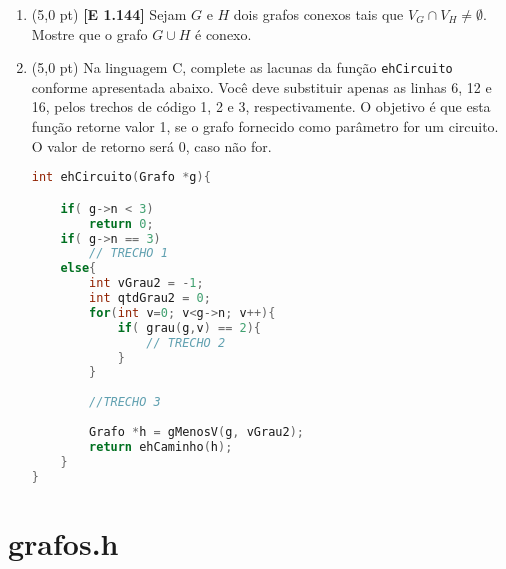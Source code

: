 \documentclass[12pt,a4paper,oneside]{article}
\begin{document}
\begin{enumerate}

	\item (5,0 pt) {\bf [E 1.144]} Sejam $G$ e $H$ dois grafos conexos tais que $V_G \cap V_H \not= \emptyset$. Mostre que o grafo $G \cup H$ é conexo.
	
	\item (5,0 pt) Na linguagem C, complete as lacunas da função {\tt ehCircuito} conforme apresentada abaixo. Você deve substituir apenas as linhas 6, 12 e 16, pelos trechos de código 1, 2 e 3, respectivamente. O objetivo é que esta função retorne valor 1, se o grafo fornecido como parâmetro for um circuito. O valor de retorno será 0, caso não for.

\begin{lstlisting}[language=C]
int ehCircuito(Grafo *g){

	if( g->n < 3)
		return 0;
	if( g->n == 3)
		// TRECHO 1
	else{
		int vGrau2 = -1;
		int qtdGrau2 = 0;
		for(int v=0; v<g->n; v++){
			if( grau(g,v) == 2){
				// TRECHO 2
			}
		}
	
		//TRECHO 3
		
		Grafo *h = gMenosV(g, vGrau2);
		return ehCaminho(h);
	}
}\end{lstlisting}
	
\end{enumerate}

\newpage

\section{grafos.h}
\end{document}
